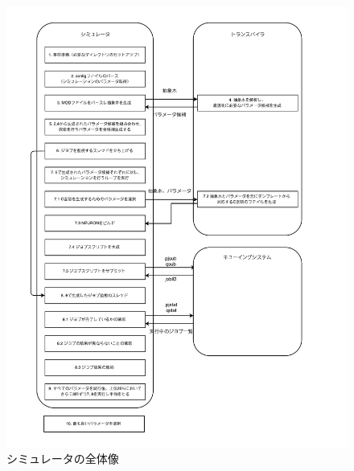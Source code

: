 \begin{figure}[h!]
    \includegraphics[width=1.1\textwidth]{./images/Genie.pdf}
    \caption{シミュレータの全体像}
    \label{fig:simulator-image}
\end{figure}~\\

\clearpage

